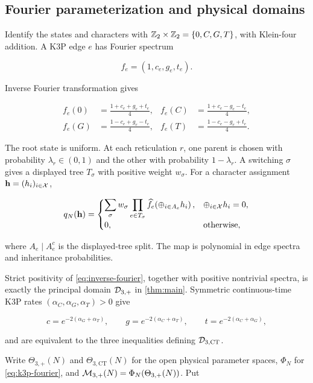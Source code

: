 \subsection{Fourier parameterization and physical domains}

Identify the states and characters with
\(\mathbb Z_2\times\mathbb Z_2=\{0,C,G,T\}\), with Klein-four addition.  A K3P edge \(e\) has Fourier
spectrum

\[
 \widehat f_e=(1,c_e,g_e,t_e).
\]

Inverse Fourier transformation gives

\begin{align}\label{eq:inverse-fourier}
 f_e(0)&=\frac{1+c_e+g_e+t_e}{4},&
 f_e(C)&=\frac{1+c_e-g_e-t_e}{4},\nonumber\\
 f_e(G)&=\frac{1-c_e+g_e-t_e}{4},&
 f_e(T)&=\frac{1-c_e-g_e+t_e}{4}.
\end{align}

The root state is uniform.  At each reticulation \(r\), one parent is chosen
with probability \(\lambda_r\in(0,1)\) and the other with probability
\(1-\lambda_r\).  A switching \(\sigma\) gives a displayed tree \(T_\sigma\)
with positive weight \(w_\sigma\).  For a character assignment
\(\mathbf h=(h_i)_{i\in\mathcal X}\),

\begin{equation}\label{eq:k3p-fourier}
 q_N(\mathbf h)=
 \begin{cases}
 \displaystyle\sum_\sigma w_\sigma
  \prod_{e\in T_\sigma}
  \widehat f_e\!\left(\mathbin\oplus_{i\in A_e}h_i\right),
  &\mathbin\oplus_{i\in\mathcal X}h_i=0,\\[2mm]
 0,&\text{otherwise},
 \end{cases}
\end{equation}

where \(A_e\mid A_e^c\) is the displayed-tree split.  The map is polynomial
in edge spectra and inheritance probabilities.

Strict positivity of \eqref{eq:inverse-fourier}, together with positive
nontrivial spectra, is exactly the principal domain \(\mathcal D_{3,+}\) in
\cref{thm:main}.  Symmetric continuous-time K3P rates
\((\alpha_C,\alpha_G,\alpha_T)>0\) give

\[
 c=e^{-2(\alpha_G+\alpha_T)},\qquad
 g=e^{-2(\alpha_C+\alpha_T)},\qquad
 t=e^{-2(\alpha_C+\alpha_G)},
\]

and are equivalent to the three inequalities defining \(\mathcal D_{3,\mathrm{CT}}\).

Write \(\Theta_{3,+}(N)\) and \(\Theta_{3,\mathrm{CT}}(N)\) for the open
physical parameter spaces, \(\Phi_N\) for \eqref{eq:k3p-fourier}, and
\(\mathcal M_{3,+}(N)=\Phi_N(\Theta_{3,+}(N))\).  Put

